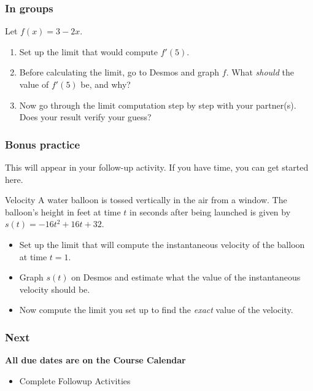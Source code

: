 \documentclass{beamer}
\begin{document}
\begin{frame}
    \frametitle{In groups}

    Let $f(x) = 3 - 2x$. \\

    \begin{enumerate}
        \item Set up the limit that would compute $f'(5)$. 
        \item Before calculating the limit, go to Desmos and graph $f$. What \emph{should} the value of $f'(5)$ be, and why? 
        \item Now go through the limit computation step by step with your partner(s). Does your result verify your guess? 
    \end{enumerate}

\end{frame}

\begin{frame}
    \frametitle{Bonus practice}

    This will appear in your follow-up activity. If you have time, you can get started here. 

    \begin{block}{Velocity}
        A water balloon is tossed vertically in the air from a window. The balloon's height in feet at time $t$ in seconds after being launched is given by $s(t) = -16t^2 + 16t + 32$. 

        \begin{itemize}
            \item Set up the limit that will compute the instantaneous velocity of the balloon at time $t=1$. 
            \item Graph $s(t)$ on Desmos and estimate what the value of the instantaneous velocity should be. 
            \item Now compute the limit you set up to find the \emph{exact} value of the velocity. 
        \end{itemize}
    \end{block}

\end{frame}

\begin{frame}
    \frametitle{Next}

\textbf{All due dates are on the Course Calendar}


    \begin{itemize}
        \item Complete Followup Activities
    \end{itemize}

\end{frame}
 
\end{document}
